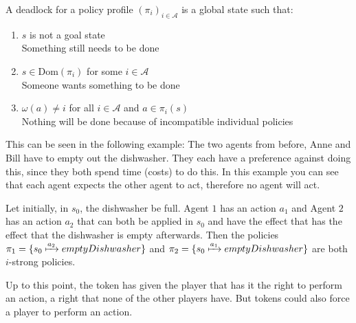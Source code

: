 A deadlock for a policy profile $(\pi_i)_{i \in \mathcal{A}}$ is a global state such that:
\begin{enumerate}
  \item $s$ is not a goal state \\
    Something still needs to be done
  \item $s \in \text{Dom}(\pi_i)$ for some $i \in \mathcal{A}$ \\
    Someone wants something to be done
  \item $\omega(a) \neq i$ for all $i \in \mathcal{A}$ and $a \in \pi_i(s)$ \\
    Nothing will be done because of incompatible individual policies
\end{enumerate}


This can be seen in the following example: The two agents from before, Anne and Bill have to empty out the dishwasher. They each have a preference against doing this, since they both spend time (costs) to do this.
In this example you can see that each agent expects the other agent to act, therefore no agent will act.

Let initially, in $s_0$, the dishwasher be full. Agent $1$ has an action $a_1$ and Agent $2$ has an action $a_2$ that can both be applied in $s_0$ and have the effect that has the effect that the dishwasher is empty afterwards. Then the policies $\pi_1 = \{s_0 \xmapsto{a_2} emptyDishwasher \}$ and $\pi_2 = \{s_0 \xmapsto{a_1} emptyDishwasher \}$ are both $i$-strong policies.


Up to this point, the token has given the player that has it the right to perform an action, a right that none of the other players have. But tokens could also force a player to perform an action.

